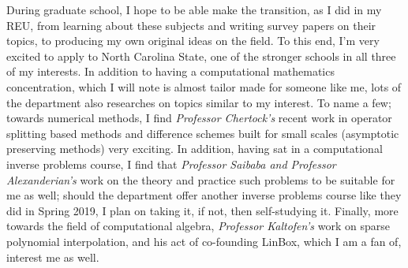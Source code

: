 \documentclass[11pt]{article}
\begin{document}
During graduate school, I hope to be able make the transition, as I did in my
REU, from learning about these subjects and writing survey papers on their
topics, to producing my own original ideas on the field. To this end, I'm very
excited to apply to North Carolina State, one of the stronger schools in all
three of my interests. In addition to having a computational mathematics
concentration, which I will note is almost tailor made for someone like me, lots
of the department also researches on topics similar to my interest. To name
a few; towards numerical methods, I find {\em Professor Chertock's} recent work
in operator splitting based methods and difference schemes built for small
scales (asymptotic preserving methods) very exciting. In addition, having sat in
a computational inverse problems course, I find that {\em Professor Saibaba and
Professor Alexanderian's} work on the theory and practice such problems to be
suitable for me as well; should the department offer another inverse problems
course like they did in Spring 2019, I plan on taking it, if not, then
self-studying it. Finally, more towards the field of computational algebra, {\em
Professor Kaltofen's} work on sparse polynomial interpolation, and his act of
co-founding LinBox, which I am a fan of, interest me as well.
\end{document}
